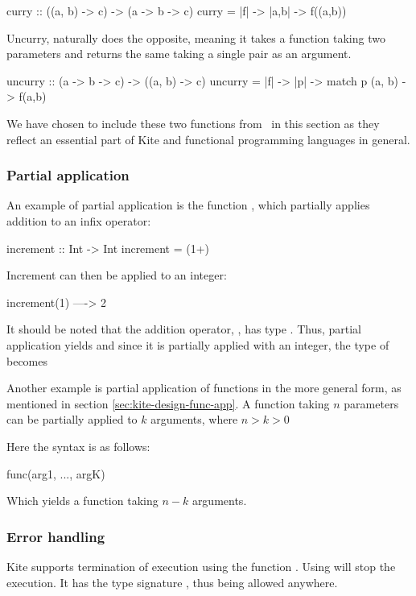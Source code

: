 \begin{kite}
curry :: ((a, b) -> c) -> (a -> b -> c)
curry = |f| -> {
  |a,b| -> {
    f((a,b))
  }
}
\end{kite}

Uncurry, naturally does the opposite, meaning it takes a function taking two parameters and returns the same taking a single pair as an argument.

\begin{kite}
uncurry :: (a -> b -> c) -> ((a, b) -> c)
uncurry = |f| -> {
  |p| -> {
    match p {
      (a, b) -> f(a,b)
    }
  }
}
\end{kite}

We have chosen to include these two functions from~ in this section as they reflect an essential part of Kite and functional programming languages in general.

\subsubsection{Partial application}
\label{sec:kite-design-partial-app}
An example of partial application is the function , which partially applies addition to an infix operator:

\begin{kite}
increment :: Int -> Int
increment = (1+)
\end{kite}

Increment can then be applied to an integer:

\begin{kite}
increment(1) ----> 2
\end{kite}

It should be noted that the addition operator, \code{+}, has type . Thus, partial application yields  and since
it is partially applied with an integer, the type of 
becomes 

Another example is partial application of functions in the more general form, as mentioned in section \ref{sec:kite-design-func-app}. A function taking $n$ parameters can be partially applied to $k$ arguments, where $n > k > 0$

Here the syntax is as follows:
\begin{kite}
func(arg1, ..., argK)
\end{kite}
Which yields a function taking $n - k$ arguments.

\subsubsection{Error handling}
Kite supports termination of execution using the function . Using  will stop the execution. It has the type signature , thus being allowed anywhere.

